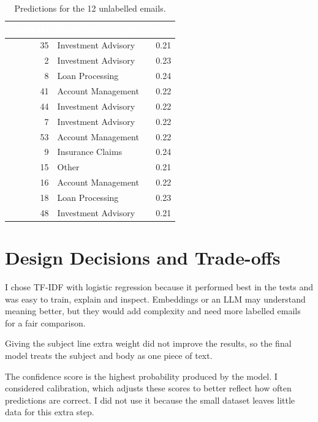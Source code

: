 \documentclass[conference]{IEEEtran}
\begin{document}
\begin{table}[H]
\centering
\footnotesize
\setlength{\tabcolsep}{3pt}
\renewcommand{\arraystretch}{1.0}
\caption{Predictions for the 12 unlabelled emails.}
\label{tab:predictions}
\begin{tabular}{@{}rlr@{}}
\toprule
\rowcolor{diagramblue}
\textcolor{white}{Email ID} & \textcolor{white}{Predicted category} & \textcolor{white}{Score} \\
\midrule
35 & Investment Advisory & 0.21 \\
\rowcolor{diagramblue!5}
2 & Investment Advisory & 0.23 \\
8 & Loan Processing & 0.24 \\
\rowcolor{diagramblue!5}
41 & Account Management & 0.22 \\
44 & Investment Advisory & 0.22 \\
\rowcolor{diagramblue!5}
7 & Investment Advisory & 0.22 \\
53 & Account Management & 0.22 \\
\rowcolor{diagramblue!5}
9 & Insurance Claims & 0.24 \\
15 & Other & 0.21 \\
\rowcolor{diagramblue!5}
16 & Account Management & 0.22 \\
18 & Loan Processing & 0.23 \\
\rowcolor{diagramblue!5}
48 & Investment Advisory & 0.21 \\
\bottomrule
\end{tabular}
\end{table}

\section{Design Decisions and Trade-offs}
I chose TF-IDF with logistic regression because it performed best in the tests and was easy to train, explain and inspect. Embeddings or an LLM may understand meaning better, but they would add complexity and need more labelled emails for a fair comparison.

Giving the subject line extra weight did not improve the results, so the final model treats the subject and body as one piece of text.

The confidence score is the highest probability produced by the model. I considered calibration, which adjusts these scores to better reflect how often predictions are correct. I did not use it because the small dataset leaves little data for this extra step.
\end{document}
